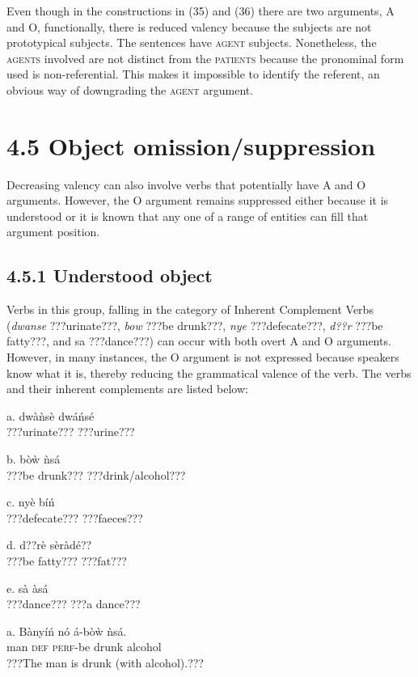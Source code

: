 \documentclass[output=paper]{langsci/langscibook}
\begin{document}
Even though in the constructions in (35) and (36) there are two arguments, A and O, functionally, there is reduced valency because the subjects are not prototypical subjects. The sentences have \textsc{agent} subjects. Nonetheless, the \textsc{agents} involved are not distinct from the \textsc{patients} because the pronominal form used is non-referential. This makes it impossible to identify the referent, an obvious way of downgrading the \textsc{agent} argument.

\section{4.5  Object omission/suppression }

Decreasing valency can also involve verbs that potentially have A and O arguments. However, the O argument remains suppressed either because it is understood or it is known that any one of a range of entities can fill that argument position.

\subsection{4.5.1  Understood object}

Verbs in this group, falling in the category of Inherent Complement Verbs (\emph{dwanse} ???urinate???, \emph{bow} ???be drunk???, \emph{nye} ???defecate???, \emph{d??r} ???be fatty???, and sa ???dance???) can occur with both overt A and O arguments. However, in many instances, the O argument is not expressed because speakers know what it is, thereby reducing the grammatical valence of the verb. The verbs and their inherent complements are listed below:


\ea
a.  dwàǹsè   dwáńsé\\
\glt   ???urinate???  ???urine???
\z

\ea
b.  bòẁ    ǹsá\\
\glt   ???be drunk???  ???drink/alcohol???
\z

\ea
c.  nyè    bíń\\
\glt   ???defecate???  ???faeces???
\z

\ea
d.  d??rè    sèràdé??\\
\glt   ???be fatty???  ???fat???
\z

\ea
e.  sà    àsá\\
\glt   ???dance???    ???a dance???
\z

\ea
\gll a.  Bànyíń  nó  á-bòẁ    ǹsá.\\
       man  \textsc{def}  \textsc{perf}{}-be drunk  alcohol\\
\glt ???The man is drunk (with alcohol).???
\z
\end{document}
